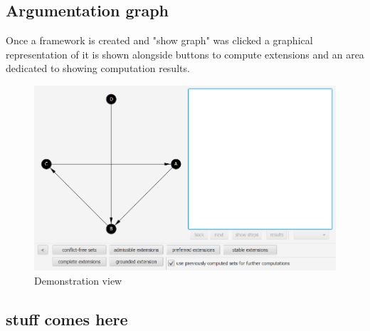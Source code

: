 \documentclass{article}
\begin{document}
\subsection{Argumentation graph}
Once a framework is created and "show graph" was clicked a graphical representation of it is shown alongside buttons to compute extensions and an area dedicated to showing computation results.

\FloatBarrier
	\begin{figure}[!htb]
		\includegraphics[scale=0.6]{pics/demo.png}
		\caption{Demonstration view}
	\end{figure}
\FloatBarrier

\subsection{stuff comes here}
\end{document}
